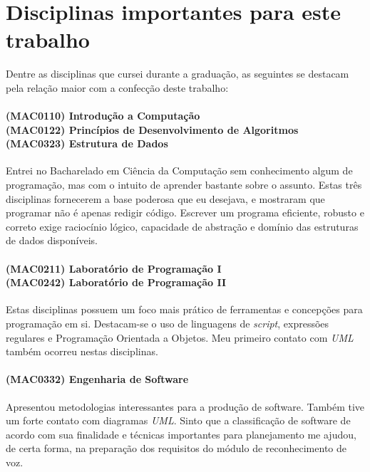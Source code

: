 \chapter*{Disciplinas importantes para este trabalho}

Dentre as disciplinas que cursei durante a graduação, as seguintes se destacam pela relação maior com a confecção deste trabalho:

\subsubsection{(MAC0110) Introdução a Computação \\
(MAC0122) Princípios de Desenvolvimento de Algoritmos \\
(MAC0323) Estrutura de Dados}

Entrei no Bacharelado em Ciência da Computação sem conhecimento algum de programação, mas com o intuito de aprender bastante sobre o assunto. Estas três disciplinas fornecerem a base poderosa que eu desejava, e mostraram que programar não é apenas redigir código. Escrever um programa eficiente, robusto e correto exige raciocínio lógico, capacidade de abstração e domínio das estruturas de dados disponíveis.

\subsubsection{(MAC0211) Laboratório de Programação I \\
(MAC0242) Laboratório de Programação II}

Estas disciplinas possuem um foco mais prático de ferramentas e concepções para programação em si. Destacam-se o uso de linguagens de \textit{script}, expressões regulares e Programação Orientada a Objetos. Meu primeiro contato com \textit{UML} também ocorreu nestas disciplinas.

\subsubsection{(MAC0332) Engenharia de Software}

Apresentou metodologias interessantes para a produção de software. Também tive um forte contato com diagramas \textit{UML}. Sinto que a classificação de software de acordo com sua finalidade e técnicas importantes para planejamento me ajudou, de certa forma, na preparação dos requisitos do módulo de reconhecimento de voz.

